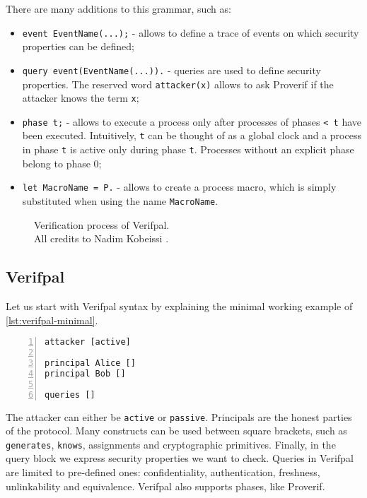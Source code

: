 \lstset{language=proverif}
There are many additions to this grammar, such as:
\begin{itemize}
    \item{\lstinline{event EventName(...);} - allows to define a trace of events on which security properties can be defined;}
    \item{\lstinline{query event(EventName(...)).} - queries are used to define security properties. The reserved word \lstinline{attacker(x)} allows to ask Proverif if the attacker knows the term \lstinline{x};}
    \item{\lstinline{phase t;} - allows to execute a process only after processes of phases \lstinline{< t} have been executed. Intuitively, \lstinline{t} can be thought of as a global clock and a process in phase \lstinline{t}  is active only during phase \lstinline{t}. Processes without an explicit phase belong to phase 0;}
    \item{\lstinline{let MacroName = P.} - allows to create a process macro, which is simply substituted when using the name \lstinline{MacroName}.}
\end{itemize}


\begin{figure}[t]
    \centering
    \caption{Verification process of Verifpal.\\ All credits to Nadim Kobeissi \cite{VerifpalManual}.}
    \label{fig:verifpal-verification}
\end{figure}


\subsection{Verifpal}


Let us start with Verifpal syntax by explaining the minimal working example of \cref{lst:verifpal-minimal}.

\lstset{language=verifpal}
\begin{lstlisting}[numbers=left,caption={Verifpal's minimal working example}, label={lst:verifpal-minimal}]
attacker [active]

principal Alice []
principal Bob []

queries []
\end{lstlisting}

The attacker can either be \lstinline{active} or \lstinline{passive}.
Principals are the honest parties of the protocol. Many constructs can be used between square brackets, such as \lstinline{generates}, \lstinline{knows}, assignments and cryptographic primitives.
Finally, in the query block we express security properties we want to check. Queries in Verifpal are limited to pre-defined ones: confidentiality, authentication, freshness, unlinkability and equivalence.
Verifpal also supports phases, like Proverif.


